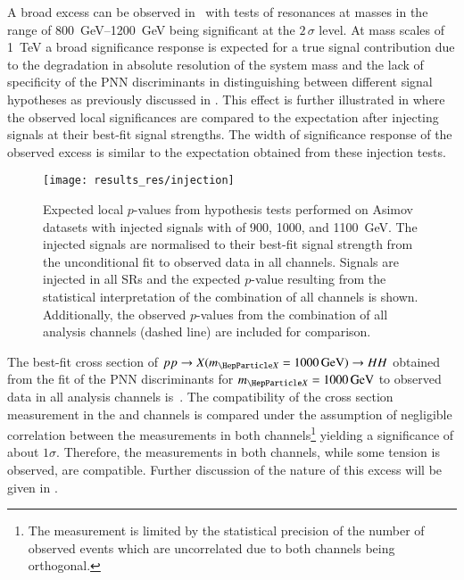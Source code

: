 A broad excess can be observed in~ with tests of
resonances at masses in the range of \SIrange{800}{1200}{\GeV} being significant
at the $2\,\sigma$ level. At mass scales of \SI{1}{\TeV} a broad significance
response is expected for a true signal contribution due to the degradation in
absolute resolution of the \HH system mass and the lack of specificity of the
PNN discriminants in distinguishing between different signal hypotheses as
previously discussed in . This effect is further illustrated
in  where the observed local significances are
compared to the expectation after injecting signals at their best-fit signal
strengths. The width of significance response of the observed excess is similar
to the expectation obtained from these injection tests.

\begin{figure}[htbp]
  \centering

  \texttt{[image: results\_res/injection]}

  \caption{Expected local $p$-values from hypothesis tests performed on Asimov
    datasets with injected signals with \mX of 900, 1000, and
    \SI[group-minimum-digits=5]{1100}{\GeV}. The injected signals are normalised
    to their best-fit signal strength from the unconditional fit to observed
    data in all channels.  Signals are injected in all SRs and the expected
    $p$-value resulting from the statistical interpretation of the combination
    of all channels is shown. Additionally, the observed $p$-values from the
    combination of all analysis channels (dashed line) are included for
    comparison.}
  \label{fig:local_pvalues_injected}
\end{figure}

The best-fit cross section of $pp \to X(\mX = \SI{1000}{\GeV}) \to HH$ obtained
from the fit of the PNN discriminants for $\mX = \SI{1000}{\GeV}$ to observed
data in all analysis channels is~. The
compatibility of the cross section measurement in the \hadhad and \lephad
channels is compared under the assumption of negligible correlation between the
measurements in both channels\footnote{The measurement is limited by the
  statistical precision of the number of observed events which are uncorrelated
  due to both channels being orthogonal.} yielding a significance of about
$1\sigma$. Therefore, the measurements in both channels, while some tension is
observed, are compatible. Further discussion of the nature of this excess will
be given in .

